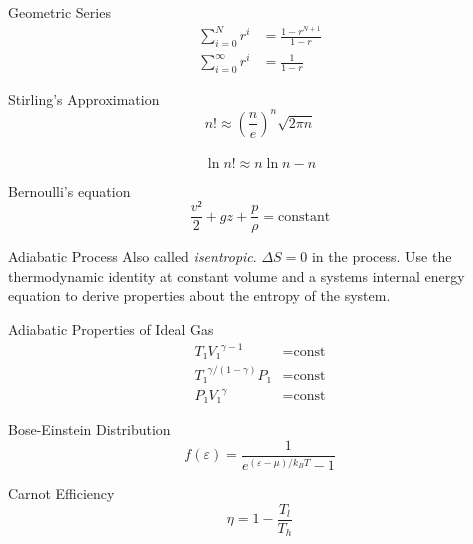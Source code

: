 \documentclass[avery5371]{flashcards}
\begin{document}
\begin{flashcard}{Geometric Series}
	\begin{align*}
		\sum_{i=0}^N r^i &= \frac{1 - r^{N+1}}{1 - r} \\
		\sum_{i=0}^∞ r^i &= \frac{1}{1 - r}
	\end{align*}
\end{flashcard}

\begin{flashcard}{Stirling's Approximation}
	\[ n! ≈ (\frac ne)^n \sqrt{2πn} \] \\
	\[ \ln n! ≈ n\ln n - n \]
\end{flashcard}


\begin{flashcard}{Bernoulli's equation}
	\[ \frac{v²}{2} + gz + \frac{p}{ρ} = \text{constant} \]
\end{flashcard}


\begin{flashcard}{Adiabatic Process}
	Also called \emph{isentropic}. $ΔS = 0$ in the process. Use the
	thermodynamic identity at constant volume and a systems internal energy
	equation to derive properties about the entropy of the system.
\end{flashcard}

\begin{flashcard}{Adiabatic Properties of Ideal Gas}
	\begin{align*}
		T₁ {V₁}^{γ-1} &= \text{const} \\
		{T₁}^{γ/(1-γ)} P₁ &= \text{const} \\
		P₁ {V₁}^γ &= \text{const}
	\end{align*}
\end{flashcard}

\begin{flashcard}{Bose-Einstein Distribution}
	\[ f(ε) = \frac{1}{e^{(ε-μ)/k_B T} - 1} \]
\end{flashcard}

\begin{flashcard}{Carnot Efficiency}
	\[ η = 1 - \frac{T_l}{T_h} \]
\end{flashcard}
\end{document}
